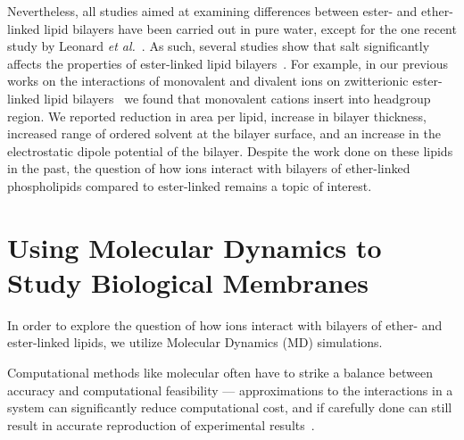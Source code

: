 \documentclass[12pt,openany,final]{book}
\newcommand{\etal}{\textit{et al.}}
\begin{document}
Nevertheless, all studies aimed at examining differences between ester- and ether-linked lipid bilayers have been carried out in pure water, except for the one recent study by 
Leonard \etal~\cite{leonard:2018}. As such, several studies show that salt significantly 
affects the properties of ester-linked lipid bilayers~\cite{kruczek:2019,kruczek:2017, duro:2016,pabst:2007,sachs:2004,petrache:2006:swelling}. 
For example, in our previous works on the interactions of monovalent and divalent ions on zwitterionic ester-linked lipid bilayers~\cite{kruczek:2019,kruczek:2017}
we found that monovalent cations insert into headgroup region. 
We reported reduction in area per lipid, increase in  bilayer thickness, increased range of ordered solvent at the bilayer surface, and an increase in
the electrostatic dipole potential of the bilayer.
Despite the work done on these lipids in the past, the question of how ions interact with bilayers of ether-linked
phospholipids compared to ester-linked remains a topic of interest.



\section{Using Molecular Dynamics to Study Biological Membranes}
In order to explore the question of how ions interact with bilayers of ether- and ester-linked lipids, we utilize 
Molecular Dynamics (MD) simulations.

Computational methods like molecular often have to strike a balance between accuracy and computational feasibility --- approximations
to the interactions in a system can significantly reduce computational cost, and if carefully done can still result in
accurate reproduction of experimental results~\cite{pandit:2008:simulationtextbook}.
\end{document}
